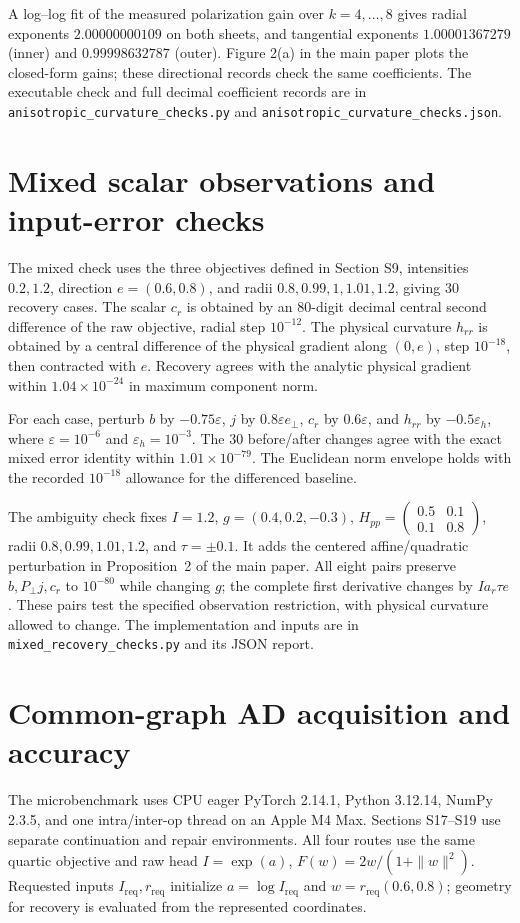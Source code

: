 \documentclass[10pt,a4paper]{article}
\begin{document}
A log--log fit of the measured polarization gain over $k=4,\ldots,8$ gives radial exponents $2.00000000109$ on both sheets, and tangential exponents $1.00001367279$ (inner) and $0.99998632787$ (outer). Figure 2(a) in the main paper plots the closed-form gains; these directional records check the same coefficients. The executable check and full decimal coefficient records are in \nolinkurl{anisotropic_curvature_checks.py} and \nolinkurl{anisotropic_curvature_checks.json}.


\section{Mixed scalar observations and input-error checks}
The mixed check uses the three objectives defined in Section S9, intensities $0.2,1.2$, direction $e=(0.6,0.8)$, and radii $0.8,0.99,1,1.01,1.2$, giving 30 recovery cases. The scalar $c_r$ is obtained by an 80-digit decimal central second difference of the raw objective, radial step $10^{-12}$. The physical curvature $h_{rr}$ is obtained by a central difference of the physical gradient along $(0,e)$, step $10^{-18}$, then contracted with $e$. Recovery agrees with the analytic physical gradient within $1.04\times10^{-24}$ in maximum component norm.

For each case, perturb $b$ by $-0.75\varepsilon$, $j$ by $0.8\varepsilon e_\perp$, $c_r$ by $0.6\varepsilon$, and $h_{rr}$ by $-0.5\varepsilon_h$, where $\varepsilon=10^{-6}$ and $\varepsilon_h=10^{-3}$. The 30 before/after changes agree with the exact mixed error identity within $1.01\times10^{-79}$. The Euclidean norm envelope holds with the recorded $10^{-18}$ allowance for the differenced baseline.

The ambiguity check fixes $I=1.2$, $g=(0.4,0.2,-0.3)$, $H_{pp}=\left(\begin{smallmatrix}0.5&0.1\\0.1&0.8\end{smallmatrix}\right)$, radii $0.8,0.99,1.01,1.2$, and $\tau=\pm0.1$. It adds the centered affine/quadratic perturbation in Proposition~2 of the main paper. All eight pairs preserve $b,P_\perp j,c_r$ to $10^{-80}$ while changing $g$; the complete first derivative changes by $Ia_r\tau e$. These pairs test the specified observation restriction, with physical curvature allowed to change. The implementation and inputs are in \nolinkurl{mixed_recovery_checks.py} and its JSON report.

\section{Common-graph AD acquisition and accuracy}
The microbenchmark uses CPU eager PyTorch 2.14.1, Python 3.12.14, NumPy 2.3.5, and one intra/inter-op thread on an Apple M4 Max. Sections S17--S19 use separate continuation and repair environments. All four routes use the same quartic objective and raw head $I=\exp(a)$, $F(w)=2w/(1+\|w\|^2)$. Requested inputs $I_{\mathrm{req}},r_{\mathrm{req}}$ initialize $a=\log I_{\mathrm{req}}$ and $w=r_{\mathrm{req}}(0.6,0.8)$; geometry for recovery is evaluated from the represented coordinates.
\end{document}
